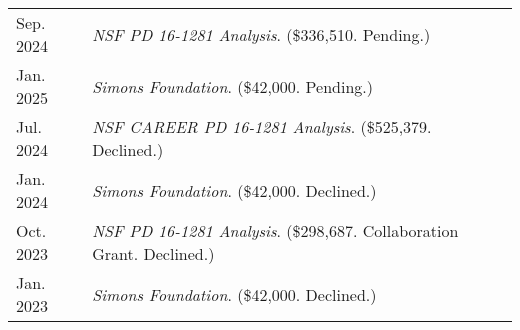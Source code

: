 
    \medskip


    \medskip
    
    \begin{center}
    {
    \renewcommand{\arraystretch}{1.5}
    \begin{longtable}{p{}  p{}}
     Sep.  2024 & \textit{NSF PD 16-1281 Analysis}. (\$336,510. Pending.) \\ 
 Jan.  2025 & \textit{Simons Foundation}. (\$42,000. Pending.) \\ 
 Jul.  2024 & \textit{NSF CAREER PD 16-1281 Analysis}. (\$525,379. Declined.) \\ 
 Jan.  2024 & \textit{Simons Foundation}. (\$42,000. Declined.) \\ 
 Oct.  2023 & \textit{NSF PD 16-1281 Analysis}. (\$298,687. Collaboration Grant. Declined.) \\ 
 Jan.  2023 & \textit{Simons Foundation}. (\$42,000. Declined.) 
    \end{longtable}
    } 
    \end{center}

    \vspace{-1em}
    